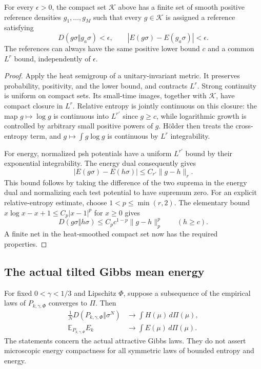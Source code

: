 \begin{lemma}
\label{att:smooth-net}
For every $\epsilon>0$, the compact set $\mathcal K$ above has a
finite set of smooth positive reference densities $g_1,\ldots,g_M$
such that every $g\in\mathcal K$ is assigned a reference satisfying
\[
 D(g\sigma\Vert g_a\sigma)<\epsilon,
 \qquad |E(g\sigma)-E(g_a\sigma)|<\epsilon.
\]
The references can always have the same positive lower bound $c$ and
a common $L^r$ bound, independently of $\epsilon$.
\end{lemma}

\begin{proof}
Apply the heat semigroup of a unitary-invariant metric. It preserves
probability, positivity, and the lower bound, and contracts $L^r$.
Strong continuity is uniform on compact sets. Its small-time images,
together with $\mathcal K$, have compact closure in $L^r$.
Relative entropy is jointly continuous on this closure: the map
$g\mapsto\log g$ is continuous into $L^{r'}$ since $g\ge c$, while
logarithmic growth is controlled by arbitrary small positive powers
of $g$. H\"older then treats the cross-entropy term, and
$g\mapsto\int g\log g$ is continuous by $L^r$ integrability.

For energy, normalized psh potentials have a uniform $L^{r'}$ bound
by their exponential integrability. The energy dual consequently gives
\[
 |E(g\sigma)-E(h\sigma)|\le C_{r'}\|g-h\|_r.
\]
This bound follows by taking the difference of the two suprema in the
energy dual and normalizing each test potential to have supremum zero.
For an explicit relative-entropy estimate, choose
$1<p\le\min(r,2)$. The elementary bound
$x\log x-x+1\le C_p|x-1|^p$ for $x\ge0$ gives
\[
 D(g\sigma\Vert h\sigma)
 \le C_p c^{1-p}\|g-h\|_p^p\qquad(h\ge c).
\]
A finite net in the heat-smoothed compact set now has the required
properties.
\end{proof}

\subsection{The actual tilted Gibbs mean energy}

\begin{theorem}
\label{att:gibbs-energy-limit}
For fixed $0<\gamma<1/3$ and Lipschitz $\Phi$, suppose a subsequence
of the empirical laws of $P_{k,\gamma,\Phi}$ converges to $\Pi$.
Then
\begin{align}
 \frac1N D(P_{k,\gamma,\Phi}\Vert\sigma^N)
       &\longrightarrow\int H(\mu)\,d\Pi(\mu),\\
 \mathbb E_{P_{k,\gamma,\Phi}}E_k
       &\longrightarrow\int E(\mu)\,d\Pi(\mu).
 \label{att:gibbs-energy-limit-eq}
\end{align}
The statements concern the actual attractive Gibbs laws. They do not
assert microscopic energy compactness for all symmetric laws of
bounded entropy and energy.
\end{theorem}

